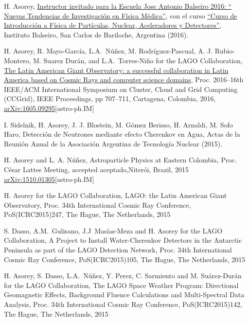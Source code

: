 \begin{etaremune}
\item {} H. Asorey, \href{https://fisica.cab.cnea.gov.ar/jab2016/}{{Instructor invitado para la Escuela Jose Antonio Balseiro 2016: `` Nuevas Tendencias de Investigación en Física Médica''}}, con el curso \href{ https://github.com/asoreyh/intro-nuclear-fisica-medica }{{``Curso de Introducción a Física de Partículas, Nuclear, Aceleradores y Detectores''}}, Instituto Balseiro, San Carlos de Bariloche, Argentina (2016).

\item {} H. Asorey, R. Mayo-García, L.A.\ Núñez, M. Rodríguez-Pascual, A. J. Rubio-Montero, M. Suarez Durán, and L.A.\ Torres-Niño for the LAGO Collaboration, {{\href{http://dx.doi.org/10.1109/CCGrid.2016.110}{The Latin American Giant Observatory: a successful collaboration in Latin America based on Cosmic Rays and computer science domains}}}, \en Proc.
2016--16th IEEE/ACM International Symposium on Cluster, Cloud and Grid Computing (CCGrid), IEEE Proceedings, pp 707--711, Cartagena, Colombia, 2016, \href{http://arxiv.org/abs/1605.09295}{arXiv:1605.09295}[astro-ph.IM]

\item {} I. Sidelnik, H. Asorey, J. J. Blostein, M. Gómez Berisso, H. Arnaldi, M. Sofo Haro, {{Detección de Neutrones mediante efecto Cherenkov en Agua}}, Actas de la Reunión Anual de la Asociación Argentina de Tecnología Nuclear (2015).

\item {}H. Asorey and L. A. Núñez, {{Astroparticle Physics at Eastern Colombia}}, \en Proc.
César Lattes Meeting, \ifeng accepted \else aceptado,\fi Niterói, Brazil, 2015 \href{http://arxiv.org/abs/1510.01305}{arXiv:1510.01305}[astro-ph.IM]

\item {}H. Asorey for the LAGO Collaboration, {{LAGO: the Latin American Giant Observatory}}, \en Proc.
34th International Cosmic Ray Conference, PoS(ICRC2015)247, The Hague, The Netherlands, 2015

\item {}S. Dasso, A.M.\ Gulisano, J.J\  Masías-Meza and H. Asorey for the LAGO Collaboration, {{A Project to Install Water-Cherenkov Detectors in the Antarctic Peninsula as part of the LAGO Detection Network}}, \en Proc.
34th International Cosmic Ray Conference, PoS(ICRC2015)105, The Hague, The Netherlands, 2015

\item {}H. Asorey, S. Dasso, L.A.\ Núñez, Y. Perez, C. Sarmiento and M. Suárez-Durán for the LAGO Collaboration, {{The LAGO Space Weather Program: Directional Geomagnetic Effects, Background Fluence Calculations and Multi-Spectral Data Analysis}}, \en Proc.
34th International Cosmic Ray Conference, PoS(ICRC2015)142, The Hague, The Netherlands, 2015


\end{etaremune}
